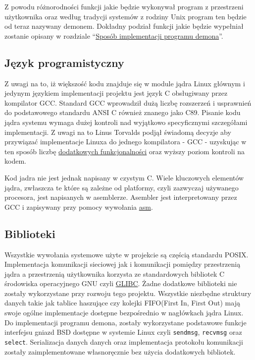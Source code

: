 Z powodu różnorodności funkcji jakie będzie wykonywał program z
przestrzeni użytkownika oraz według tradycji systemów z rodziny Unix
program ten będzie od teraz nazywany demonem. Dokładny podział funkcji
jakie będzie wypełniał zostanie opisany w rozdziale
``\hyperref[sposób-implementacji-programu-demona]{Sposób implementacji
programu demona}''.

\subsection{Język programistyczny}

Z uwagi na to, iż większość kodu znajduje się w module jądra Linux
głównym i jedynym językiem implementacji projektu jest język C
obsługiwany przez kompilator GCC. Standard GCC wprowadził dużą liczbę
rozszerzeń i usprawnień do podstawowego standardu ANSI C również znanego
jako C89. Pisanie kodu jądra systemu wymaga dużej kontroli nad wyjątkowo
specyficznymi szczegółami implementacji. Z uwagi na to Linus Torvalds
podjął świadomą decyzje aby przywiązać implementacje Linuxa do jednego
kompilatora - GCC - uzyskując w ten sposób liczbę
\href{http://gcc.gnu.org/onlinedocs/gcc/C-Extensions.html\#C-Extensions}{dodatkowych
funkcjonalności} oraz wyższy poziom kontroli na kodem.

Kod jadra nie jest jednak napisany w czystym C. Wiele kluczowych
elementów jądra, zwłaszcza te które są zależne od platformy, czyli
zazwyczaj używanego procesora, jest napisanych w asemblerze. Asembler
jest interpretowany przez GCC i zapisywany przy pomocy wywołania
\href{http://www.ibiblio.org/gferg/ldp/GCC-Inline-Assembly-HOWTO.html\#s4}{asm}.

\subsection{Biblioteki}

Wszystkie wywołania systemowe użyte w projekcie są częścią standardu
POSIX. Implementacja komunikacji sieciowej jak i komunikacji pomiędzy
przestrzenią jądra a przestrzenią użytkownika korzysta ze standardowych
bibliotek C środowiska operacyjnego GNU czyli
\href{https://www.gnu.org/software/libc/}{GLIBC}. Żadne dodatkowe
biblioteki nie zostały wykorzystane przy rozwoju tego projektu.
Wszystkie niezbędne struktury danych takie jak tablice haszujące czy
kolejki FIFO(First In, First Out) mają swoje ogólne implementacje
dostępne bezpośrednio w nagłówkach jądra Linux. Do implementacji
programu demona, zostały wykorzystane podstawowe funkcje interfejsu
gniazd BSD dostępne w systemie Linux czyli \texttt{sendmsg},
\texttt{recvmsg} oraz \texttt{select}. Serializacja danych danych oraz
implementacja protokołu komunikacji zostały zaimplementowane
własnoręcznie bez użycia dodatkowych bibliotek.

